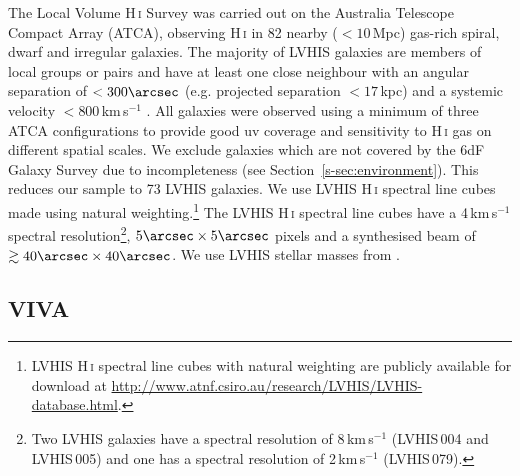 \documentclass[fleqn,usenatbib]{mnras}
\begin{document}
The Local Volume H\,\textsc{i} Survey \citep[LVHIS,][]{Koribalski2018} was carried out on the Australia Telescope Compact Array (ATCA), observing H\,\textsc{i} in 82 nearby ($<10$\,Mpc) gas-rich spiral, dwarf and irregular galaxies. The majority of LVHIS galaxies are members of local groups or pairs and have at least one close neighbour with an angular separation of $<300\arcsec$ (e.g. projected separation $<17$\,kpc) and a systemic velocity $<800$\,km\,s$^{-1}$ \citep[group membership and number of close neighbours are tabulated in][]{Koribalski2018}. All galaxies were observed using a minimum of three ATCA configurations to provide good uv coverage and sensitivity to H\,\textsc{i} gas on different spatial scales. We exclude galaxies which are not covered by the 6dF Galaxy Survey due to incompleteness (see Section~\ref{s-sec:environment}). This reduces our sample to 73 LVHIS galaxies. We use LVHIS H\,\textsc{i} spectral line cubes made using natural weighting.\footnote{LVHIS H\,\textsc{i} spectral line cubes with natural weighting are publicly available for download at \url{http://www.atnf.csiro.au/research/LVHIS/LVHIS-database.html}.} The LVHIS H\,\textsc{i} spectral line cubes have a 4\,km\,s$^{-1}$ spectral resolution\footnote{Two LVHIS galaxies have a spectral resolution of 8\,km\,s$^{-1}$ (LVHIS\,004 and LVHIS\,005) and one has a spectral resolution of 2\,km\,s$^{-1}$ (LVHIS\,079).}, $5\arcsec\times5\arcsec$ pixels and a synthesised beam of $\gtrsim40\arcsec\times40\arcsec$. We use LVHIS stellar masses from \cite{Wang2017}.

\subsection{VIVA}
\label{s-sec:viva}
\end{document}
